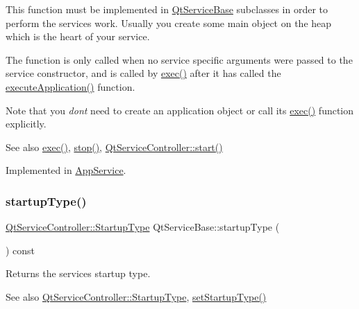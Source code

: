 This function must be implemented in \hyperlink{class_qt_service_base}{Qt\+Service\+Base} subclasses in order to perform the service\textquotesingle{}s work. Usually you create some main object on the heap which is the heart of your service.

The function is only called when no service specific arguments were passed to the service constructor, and is called by \hyperlink{class_qt_service_base_afae2e589de71c1ae3ae8db3dc9ab9c64}{exec()} after it has called the \hyperlink{class_qt_service_base_ab70633cd29a22758dfa0502b77e564f6}{execute\+Application()} function.

Note that you {\itshape don\textquotesingle{}t} need to create an application object or call its \hyperlink{class_qt_service_base_afae2e589de71c1ae3ae8db3dc9ab9c64}{exec()} function explicitly.

\begin{DoxySeeAlso}{See also}
\hyperlink{class_qt_service_base_afae2e589de71c1ae3ae8db3dc9ab9c64}{exec()}, \hyperlink{class_qt_service_base_a8d52c1b8fd06b50bdc0a0c6f9936a68e}{stop()}, \hyperlink{class_qt_service_controller_a5e9d6da5081d70f31611456d0ef0687e}{Qt\+Service\+Controller\+::start()} 
\end{DoxySeeAlso}


Implemented in \hyperlink{class_app_service_a987c81ba936b7ce15b84cba99851dabb}{App\+Service}.

\mbox{\label{class_qt_service_base_aa1b3bf9b7fc09777b422f49f7bcfbcbe}} 
\subsubsection{\texorpdfstring{startup\+Type()}{startupType()}}
{\footnotesize\ttfamily \hyperlink{class_qt_service_controller_a946ac2b079d9760503da923c2eaf0aac}{Qt\+Service\+Controller\+::\+Startup\+Type} Qt\+Service\+Base\+::startup\+Type (\begin{DoxyParamCaption}{ }\end{DoxyParamCaption}) const}

Returns the service\textquotesingle{}s startup type.

\begin{DoxySeeAlso}{See also}
\hyperlink{class_qt_service_controller_a946ac2b079d9760503da923c2eaf0aac}{Qt\+Service\+Controller\+::\+Startup\+Type}, \hyperlink{class_qt_service_base_a6beddd54c973c3a7d81075b2f3f80df2}{set\+Startup\+Type()} 
\end{DoxySeeAlso}
\mbox{\label{class_qt_service_base_a8d52c1b8fd06b50bdc0a0c6f9936a68e}} 
